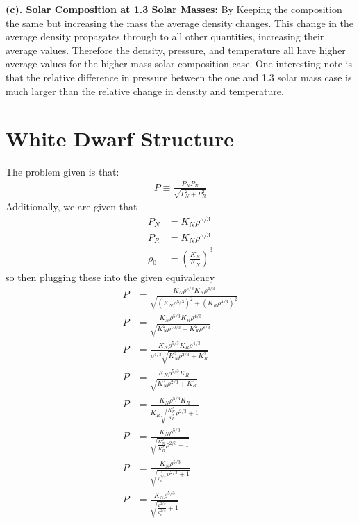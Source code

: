 \textbf{(c). Solar Composition at 1.3 Solar Masses:} By Keeping the composition the same but increasing the mass the average density changes. This change in the average density propagates through to all other quantities, increasing their average values. Therefore the density, pressure, and temperature all have higher average values for the higher mass solar composition case. One interesting note is that the relative difference in pressure between the one and 1.3 solar mass case is much larger than the relative change in density and temperature. 

\section{White Dwarf Structure}
The problem given is that:
\begin{align*}
    P \equiv \frac{P_{N}P_{R}}{\sqrt{P_{N}^{2}+P_{R}^{2}}}
\end{align*}
Additionally, we are given that
\begin{align*}
    P_{N} &= K_{N}\rho^{5/3} \\
    P_{R} &= K_{N}\rho^{5/3} \\
    \rho_{0} &= \left(\frac{K_{R}}{K_{N}}\right)^{3}
\end{align*}
so then plugging these into the given equivalency
\begin{align*}
    P &= \frac{K_{N}\rho^{5/3}K_{R}\rho^{4/3}}{\sqrt{(K_{N}\rho^{5/3})^{2}+(K_{R}\rho^{4/3})^{2}}} \\
    P &= \frac{K_{N}\rho^{5/3}K_{R}\rho^{4/3}}{\sqrt{K_{N}^{2}\rho^{10/3}+K_{R}^{2}\rho^{8/3}}} \\
    P &= \frac{K_{N}\rho^{5/3}K_{R}\rho^{4/3}}{\rho^{4/3}\sqrt{K_{N}^{2}\rho^{2/3}+K_{R}^{2}}} \\
    P &= \frac{K_{N}\rho^{5/3}K_{R}}{\sqrt{K_{N}^{2}\rho^{2/3}+K_{R}^{2}}} \\
    P &= \frac{K_{N}\rho^{5/3}K_{R}}{K_{R}\sqrt{\frac{K_{N}^{2}}{K_{R}^{2}}\rho^{2/3}+1}} \\
     P &= \frac{K_{N}\rho^{5/3}}{\sqrt{\frac{K_{N}^{2}}{K_{R}^{2}}\rho^{2/3}+1}} \\
     P &= \frac{K_{N}\rho^{5/3}}{\sqrt{\frac{1}{\rho^{2/3}_{0}}\rho^{2/3}+1}} \\
     P &= \frac{K_{N}\rho^{5/3}}{\sqrt{\frac{\rho^{2/3}}{\rho^{2/3}_{0}}+1}}
\end{align*}

